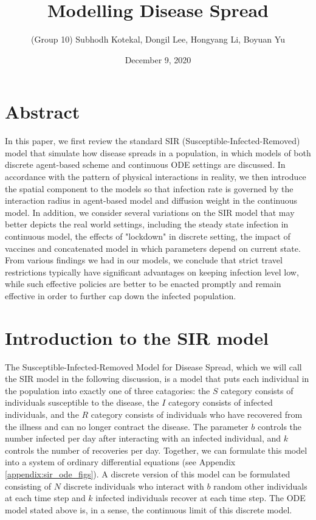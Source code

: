 \documentclass[12pt, reqno]{amsart}
\title{Modelling Disease Spread}
\author{(Group 10) Subhodh Kotekal, Dongil Lee, Hongyang Li, Boyuan Yu}
\date{December 9, 2020}
\begin{document}
    \maketitle

    \section{Abstract}
    In this paper, we first review the standard SIR (Susceptible-Infected-Removed) model that simulate how disease spreads in a population, in which models of both discrete agent-based scheme and continuous ODE settings are discussed. In accordance with the pattern of physical interactions in reality, we then introduce the spatial component to the models so that infection rate is governed by the interaction radius in agent-based model and diffusion weight in the continuous model. In addition, we consider several variations on the SIR model that may better depicts the real world settings, including the steady state infection in continuous model, the effects of "lockdown" in discrete setting, the impact of vaccines and concatenated model in which parameters depend on current state. From various findings we had in our models, we conclude that strict travel restrictions typically have significant advantages on keeping infection level low, while such effective policies are better to be enacted promptly and remain effective in order to further cap down the infected population.
    \section{Introduction to the SIR model} \label{section:intro}

    The Susceptible-Infected-Removed Model for Disease Spread, which we will call the SIR model in the following discussion, is a model that puts each individual in the population into exactly one of three catagories: the \(S\) category consists of individuals susceptible to the disease, the \(I\) category consists of infected individuals, and the \(R\) category consists of individuals who have recovered from the illness and can no longer contract the disease. The parameter \(b\) controls the number infected per day after interacting with an infected individual, and \(k\) controls the number of recoveries per day. Together, we can formulate this model into a system of ordinary differential equations (see Appendix \ref{appendix:sir_ode_figs}). A discrete version of this model can be formulated consisting of \(N\) discrete individuals who interact with \(b\) random other individuals at each time step and \(k\) infected individuals recover at each time step. The ODE model stated above is, in a sense, the continuous limit of this discrete model.
\end{document}
